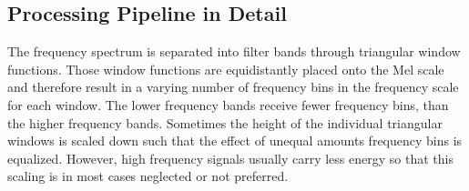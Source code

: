 
\subsection{Processing Pipeline in Detail}\label{sec:signal_mfcc_pipeline}
The frequency spectrum is separated into filter bands through triangular window functions.
Those window functions are equidistantly placed onto the Mel scale and therefore result in a varying number of frequency bins in the frequency scale for each window.
The lower frequency bands receive fewer frequency bins, than the higher frequency bands.
Sometimes the height of the individual triangular windows is scaled down such that the effect of unequal amounts frequency bins is equalized.
However, high frequency signals usually carry less energy so that this scaling is in most cases neglected or not preferred.

